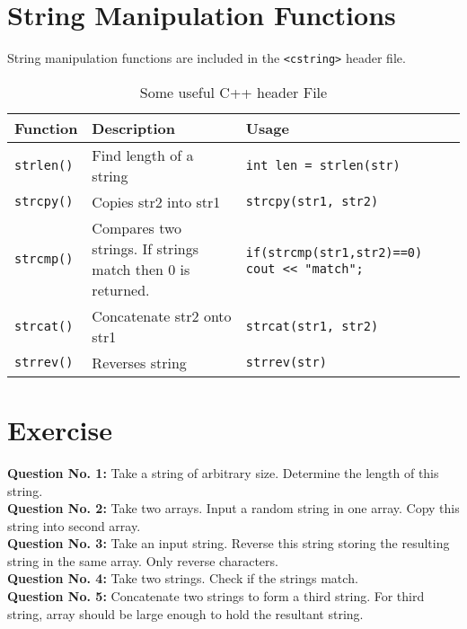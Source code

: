 \documentclass[12pt,a4paper]{article}
\begin{document}
\section{String Manipulation Functions}
String manipulation functions are included in the \verb|<cstring>| header file. 
\begin{table}[H]
\begin{center}
\vspace{0.3cm}
	\begin{tabular}{lp{5cm}p{5cm}}
	\hline \hline
		\textbf{Function} \rule{0pt}{2.6ex} & \textbf{Description} & \textbf{Usage}\\
		\hline
		\verb|strlen()| \rule{0pt}{2.6ex} & Find length of a string & \verb|int len = strlen(str)|\\
		\verb|strcpy()| & Copies str2 into str1 & \verb|strcpy(str1, str2)|\\
		\verb|strcmp()| & Compares two strings. If strings match then 0 is returned. & \verb|if(strcmp(str1,str2)==0)| \verb|    cout << "match";|\\
		\verb|strcat()| & Concatenate str2 onto str1 & \verb|strcat(str1, str2)|\\
		\verb|strrev()| & Reverses string & \verb|strrev(str)|\\
	\hline \hline
	\end{tabular}
\end{center}
\label{Some useful C++ header File}
\caption{Some useful C++ header File}
\end{table}
\section{Exercise}
\textbf{Question No. 1:} Take a string of arbitrary size. Determine the length of this string.\\
\textbf{Question No. 2:} Take two arrays. Input a random string in one array. Copy this string into second array.\\
\textbf{Question No. 3:} Take an input string. Reverse this string storing the resulting string in the same array. Only reverse characters.\\
\textbf{Question No. 4:} Take two strings. Check if the strings match.\\
\textbf{Question No. 5:} Concatenate two strings to form a third string. For third string, array should be large enough to hold the resultant string.\\
\end{document}
